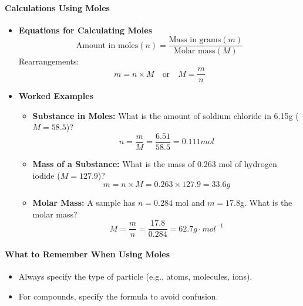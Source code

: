 \paragraph{Calculations Using Moles}
\begin{itemize}
    \item \textbf{Equations for Calculating Moles}
    \begin{equation}
        \text{Amount in moles} (n) = \frac{\text{Mass in grams} (m)}{\text{Molar mass} (M)}
    \end{equation}
    Rearrangements:
    \begin{equation}
        m = n \times M \quad \text{or} \quad M = \frac{m}{n}
    \end{equation}
    \item \textbf{Worked Examples}
    \begin{itemize}
        \item \textbf{Substance in Moles:} What is the amount of soldium chloride in 6.15g ($M = 58.5$)?
        \begin{equation}
            n = \frac{m}{M} = \frac{6.51}{58.5} = 0.111 \unit{mol}
        \end{equation}
        \item \textbf{Mass of a Substance:} What is the mass of 0.263 mol of hydrogen iodide ($M = 127.9$)?
        \begin{equation}
            m = n \times M = 0.263 \times 127.9 = 33.6 \unit{g}
        \end{equation}
        \item \textbf{Molar Mass:} A sample has $n = 0.284$ mol and $m = 17.8$g. What is the molar mass?
        \begin{equation}
            M = \frac{m}{n} = \frac{17.8}{0.284} = 62.7 \unit{g \cdot mol^{-1}}
        \end{equation}
    \end{itemize}
\end{itemize}

\paragraph{What to Remember When Using Moles}
\begin{itemize}
    \item Always specify the type of particle (e.g., atoms, molecules, ions).
    \item For compounds, specify the formula to avoid confusion.
\end{itemize}